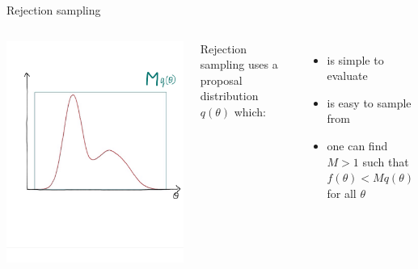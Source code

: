 \documentclass[compress]{beamer}
\begin{document}
\begin{frame}[label=sec-5-3]{Rejection sampling}
    \begin{columns}[c] 
    \includegraphics[width=1\linewidth]{RS2}

    Rejection sampling uses a \alert{proposal distribution $q(\theta)$} which:
    \begin{itemize}
        \item is simple to evaluate
        \item is easy to sample from
        \item one can find $M>1$ such that $f(\theta) < M q(\theta)$ for all $\theta$
    \end{itemize}
\end{columns}
\end{frame}
\end{document}
